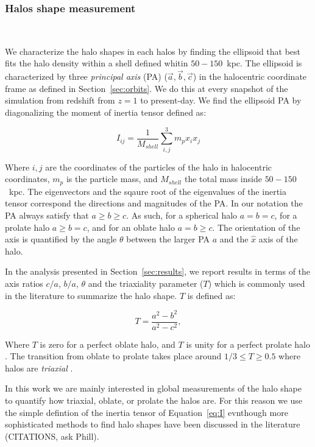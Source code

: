 \documentclass[twocolumn, linenumbers]{openjournal}
\begin{document}
\subsubsection{Halos shape measurement}~\label{sec:inertia_tensor}

We characterize the halo shapes in each halos by finding the ellipsoid that best fits 
the halo density within a shell defined whitin $50-150$~kpc.  
The ellipsoid is characterized by three \textit{principal axis} (PA)
($\vec{a}, \vec{b}, \vec{c}$) in 
the halocentric coordinate frame as defined in Section~\ref{sec:orbits}. 
We do this at every snapshot of the simulation from redshift from $z=1$ to present-day.
We find the ellipsoid PA by diagonalizing the moment of inertia tensor
defined as: 

\begin{equation}\label{eq:I}
    I_{ij} = \dfrac{1}{M_{shell}} \sum_{i,j}^{3} {m_p x_{i} x_{j}} 
\end{equation}

Where $i, j$ are the coordinates of the particles of the halo in halocentric coordinates, 
$m_p$ is the particle mass, and $M_{shell}$ the total mass inside $50-150$~kpc.
The eigenvectors and the sqaure root of the eigenvalues of the inertia tensor correspond 
the directions and magnitudes of the PA. In our notation the PA always satisfy 
that $a \geq b \geq c$. As such, for a spherical halo $a = b = c$, for a
prolate halo $a \geq b = c$, and for an oblate halo $a = b \geq c$. The orientation 
of the axis is quantified by the angle $\theta$ between the larger PA $a$ and the $\hat{x}$
axis of the halo. 

In the analysis presented in Section~\ref{sec:results}, we report results in terms of 
the axis ratios $c/a$, $b/a$, $\theta$ and the triaxiality parameter ($T$) which is commonly used 
in the literature to summarize the halo shape. $T$ is defined as:  

\begin{equation}
    T = \frac{a^2 - b^2}{a^2 - c^2},
\end{equation}

Where $T$ is zero for a perfect oblate halo, and $T$ is unity for a perfect prolate halo 
\citep{Warren1992}. The transition from oblate to prolate 
takes place around $1/3 \leq T \geq 0.5$ where halos are \textit{triaxial} \citep{Warren1992}. 

In this work we are mainly interested in global measurements of the halo shape 
to quantify how triaxial, oblate, or prolate the halos are. {\color{Coral3} For this reason we use the simple
defintion of the inertia tensor of Equation~\ref{eq:I} evnthough more sophisticated methods to find halo 
shapes have been discussed in the literature (CITATIONS, ask Phill).}
\end{document}
